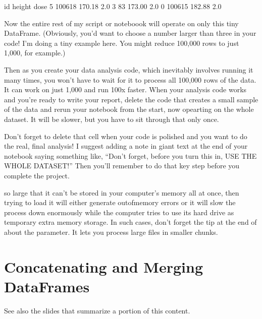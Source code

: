 \documentclass[letterpaper,10pt,english]{sphinxmanual}
\begin{document}
\begin{sphinxVerbatim}[commandchars=\\\{\}]
       id  height  dose
5  100618  170.18   2.0
3      83  173.00   2.0
0  100615  182.88   2.0
\end{sphinxVerbatim}

Now the entire rest of my script or noteboook will operate on only this tiny DataFrame.  (Obviously, you’d want to choose a number larger than three in your code!  I’m doing a tiny example here.  You might reduce 100,000 rows to just 1,000, for example.)

Then as you create your data analysis code, which inevitably involves running it many times, you won’t have to wait for it to process all 100,000 rows of the data.  It can work on just 1,000 and run 100x faster.  When your analysis code works and you’re ready to write your report, delete the code that creates a small sample of the data and re\sphinxhyphen{}run your notebook from the start, now opearting on the whole dataset.  It will be slower, but you have to sit through that only once.

  Don’t forget to delete that cell when your code is polished and you want to do the real, final analysis!  I suggest adding a note in giant text at the end of your notebook saying something like, “Don’t forget, before you turn this in, USE THE WHOLE DATASET!”  Then you’ll remember to do that key step before you complete the project.

 so large that it can’t be stored in your computer’s memory all at once, then trying to load it will either generate out\sphinxhyphen{}of\sphinxhyphen{}memory errors or it will slow the process down enormously while the computer tries to use its hard drive as temporary extra memory storage.  In such cases, don’t forget the tip at the end of  about the  parameter.  It lets you process large files in smaller chunks.


\chapter{Concatenating and Merging DataFrames}
\label{\detokenize{chapter-12-concat-and-merge:concatenating-and-merging-dataframes}}\label{\detokenize{chapter-12-concat-and-merge::doc}}
See also the slides that summarize a portion of this content.
\end{document}
